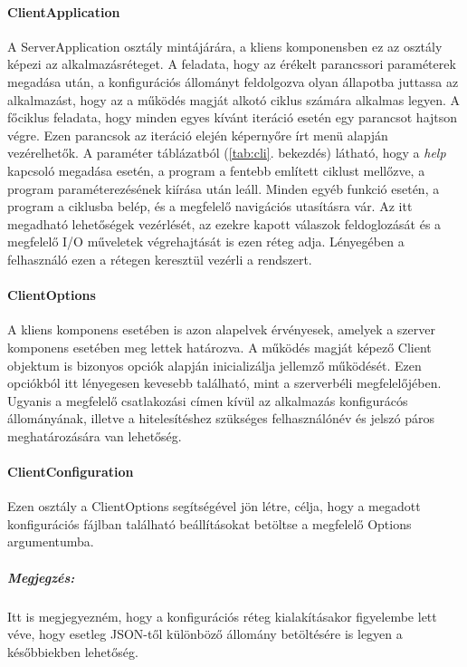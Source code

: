 \documentclass[12pt]{report}
\begin{document}
\paragraph{ClientApplication} 
A ServerApplication osztály mintájárára, a kliens komponensben ez az osztály képezi az alkalmazásréteget. A feladata, hogy az érékelt parancssori paraméterek megadása után, a konfigurációs állományt feldolgozva olyan állapotba juttassa az alkalmazást, hogy az a működés magját alkotó ciklus számára alkalmas legyen. A főciklus feladata, hogy minden egyes kívánt iteráció esetén egy parancsot hajtson végre. Ezen parancsok az iteráció elején képernyőre írt menü alapján vezérelhetők. A paraméter táblázatból (\ref{tab:cli}. bekezdés) látható, hogy a \textit{help} kapcsoló megadása esetén, a program a fentebb említett ciklust mellőzve, a program paraméterezésének kiírása után leáll. Minden egyéb funkció esetén, a program a ciklusba belép, és a megfelelő navigációs utasításra vár.
Az itt megadható lehetőségek vezérlését, az ezekre kapott válaszok feldoglozását és a megfelelő I/O műveletek végrehajtását is ezen réteg adja. Lényegében a felhasználó ezen a rétegen keresztül vezérli a rendszert.
\paragraph{ClientOptions}

A kliens komponens esetében is azon alapelvek érvényesek, amelyek a szerver komponens esetében meg lettek határozva. A működés magját képező Client objektum is bizonyos opciók alapján inicializálja jellemző működését. Ezen opciókból itt lényegesen kevesebb található, mint a szerverbéli megfelelőjében. Ugyanis  a megfelelő csatlakozási címen kívül az alkalmazás konfigurácós állományának, illetve a hitelesítéshez szükséges felhasználónév és jelszó páros meghatározására van lehetőség.
\paragraph{ClientConfiguration}
Ezen osztály a ClientOptions segítségével jön létre, célja, hogy a megadott konfigurációs fájlban található beállításokat betöltse a megfelelő Options argumentumba.
\subparagraph{Megjegzés:} 
Itt is megjegyezném, hogy a konfigurációs réteg kialakításakor figyelembe lett véve, hogy esetleg JSON-től különböző állomány betöltésére is legyen a későbbiekben lehetőség.
\end{document}
